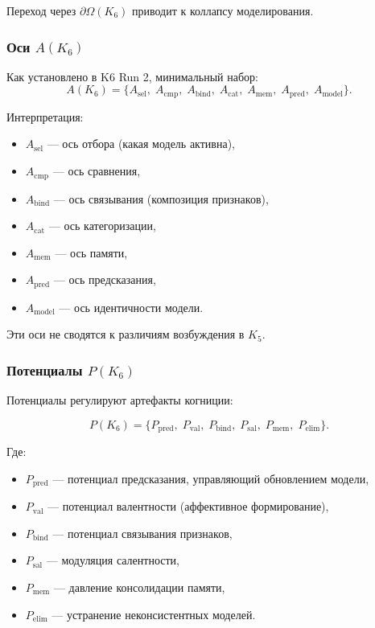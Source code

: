 Переход через $\partial \Omega(K_6)$ приводит к коллапсу моделирования.

\subsubsection{Оси \texorpdfstring{$A(K_6)$}{A(K_6)}}

Как установлено в K6 Run 2, минимальный набор:
\[
A(K_6) = \{
A_{\mathrm{sel}},\;
A_{\mathrm{cmp}},\;
A_{\mathrm{bind}},\;
A_{\mathrm{cat}},\;
A_{\mathrm{mem}},\;
A_{\mathrm{pred}},\;
A_{\mathrm{model}}
\}.
\]

Интерпретация:
\begin{itemize}
    \item $A_{\mathrm{sel}}$ — ось отбора (какая модель активна),
    \item $A_{\mathrm{cmp}}$ — ось сравнения,
    \item $A_{\mathrm{bind}}$ — ось связывания (композиция признаков),
    \item $A_{\mathrm{cat}}$ — ось категоризации,
    \item $A_{\mathrm{mem}}$ — ось памяти,
    \item $A_{\mathrm{pred}}$ — ось предсказания,
    \item $A_{\mathrm{model}}$ — ось идентичности модели.
\end{itemize}

Эти оси не сводятся к различиям возбуждения в $K_5$.

\subsubsection{Потенциалы \texorpdfstring{$P(K_6)$}{P(K_6)}}

Потенциалы регулируют артефакты когниции:

\[
P(K_6)=
\{
P_{\mathrm{pred}},\;
P_{\mathrm{val}},\;
P_{\mathrm{bind}},\;
P_{\mathrm{sal}},\;
P_{\mathrm{mem}},\;
P_{\mathrm{elim}}
\}.
\]

Где:
\begin{itemize}
    \item $P_{\mathrm{pred}}$ — потенциал предсказания, управляющий
          обновлением модели,
    \item $P_{\mathrm{val}}$ — потенциал валентности (аффективное формирование),
    \item $P_{\mathrm{bind}}$ — потенциал связывания признаков,
    \item $P_{\mathrm{sal}}$ — модуляция салентности,
    \item $P_{\mathrm{mem}}$ — давление консолидации памяти,
    \item $P_{\mathrm{elim}}$ — устранение неконсистентных моделей.
\end{itemize}


